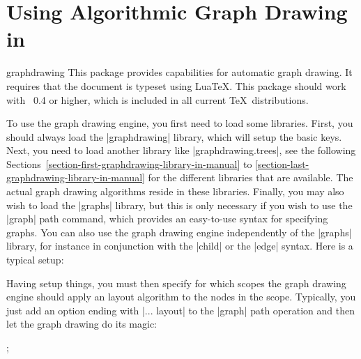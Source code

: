 %
%
%


\section{Using Algorithmic Graph Drawing in \tikzname}

{

\begin{tikzlibrary}{graphdrawing}
  This package provides capabilities for automatic graph drawing. It
  requires that the document is typeset using Lua\TeX. This package
  should work with \LuaTeX\ 0.4 or higher, which is included in all
  current \TeX\ distributions. 
\end{tikzlibrary}


To use the graph drawing engine, you first need to load some
libraries. First, you should always load the |graphdrawing| library,
which will setup the basic keys. Next, you need to load another
library like |graphdrawing.trees|, see the following
Sections~\ref{section-first-graphdrawing-library-in-manual} to
\ref{section-last-graphdrawing-library-in-manual} for the different
libraries that are available. The actual graph drawing
algorithms reside in these libraries. Finally, you may also wish to
load the |graphs| library, but this is only necessary if you wish to
use the |graph| path command, which provides an easy-to-use syntax for
specifying graphs. You can also use the graph drawing engine
independently of the |graphs| library, for instance in conjunction
with the |child| or the |edge| syntax. Here is a typical setup:

\begin{codeexample}
\usetikzlibrary{graphs,graphdrawing,graphdrawing.trees}  
\end{codeexample}

Having setup things, you must then specify for which scopes the
graph drawing engine should apply an layout algorithm to the nodes in
the scope. Typically, you just add an option ending with |... layout|
to the |graph| path operation and then let the graph drawing do its
magic:

\begin{codeexample}[]
  ;    
\end{codeexample}

}
